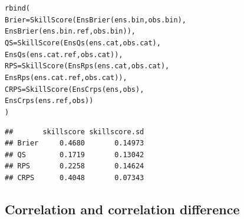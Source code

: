 \documentclass[article]{jss}\usepackage[]{graphicx}\usepackage[]{color}
\makeatletter
\newcommand{\hlstd}[1]{\textcolor[rgb]{0,0,0}{#1}}%
\newcommand{\hlkwc}[1]{\textcolor[rgb]{0,0.502,0.753}{#1}}%
\newcommand{\hlkwd}[1]{\textcolor[rgb]{0,0.267,0.4}{#1}}%
\newenvironment{kframe}{%
 \def\at@end@of@kframe{}%
 \ifinner\ifhmode%
  \def\at@end@of@kframe{\end{minipage}}%
  \begin{minipage}{\columnwidth}%
 \fi\fi%
 \def\FrameCommand##1{\hskip\@totalleftmargin \hskip-\fboxsep
 \colorbox{shadecolor}{##1}\hskip-\fboxsep
     \hskip-\linewidth \hskip-\@totalleftmargin \hskip\columnwidth}%
 \MakeFramed {\advance\hsize-\width
   \@totalleftmargin\z@ \linewidth\hsize
   \@setminipage}}%
 {\par\unskip\endMakeFramed%
 \at@end@of@kframe}
\newenvironment{knitrout}{}{} %
\makeatother
\begin{document}
\begin{knitrout}
\color{fgcolor}\begin{kframe}
\begin{alltt}
\hlkwd{rbind}\hlstd{(}
 \hlkwc{Brier} \hlstd{=} \hlkwd{SkillScore}\hlstd{(}\hlkwd{EnsBrier}\hlstd{(ens.bin, obs.bin),}
                    \hlkwd{EnsBrier}\hlstd{(ens.bin.ref, obs.bin)),}
 \hlkwc{QS}    \hlstd{=} \hlkwd{SkillScore}\hlstd{(}\hlkwd{EnsQs}\hlstd{(ens.cat, obs.cat),}
                    \hlkwd{EnsQs}\hlstd{(ens.cat.ref, obs.cat)),}
 \hlkwc{RPS}   \hlstd{=} \hlkwd{SkillScore}\hlstd{(}\hlkwd{EnsRps}\hlstd{(ens.cat, obs.cat),}
                    \hlkwd{EnsRps}\hlstd{(ens.cat.ref, obs.cat)),}
 \hlkwc{CRPS}  \hlstd{=} \hlkwd{SkillScore}\hlstd{(}\hlkwd{EnsCrps}\hlstd{(ens, obs),}
                    \hlkwd{EnsCrps}\hlstd{(ens.ref, obs))}
\hlstd{)}
\end{alltt}
\begin{verbatim}
##       skillscore skillscore.sd
## Brier     0.4680       0.14973
## QS        0.1719       0.13042
## RPS       0.2258       0.14624
## CRPS      0.4048       0.07343
\end{verbatim}
\end{kframe}
\end{knitrout}


\subsection{Correlation and correlation difference}
\end{document}
